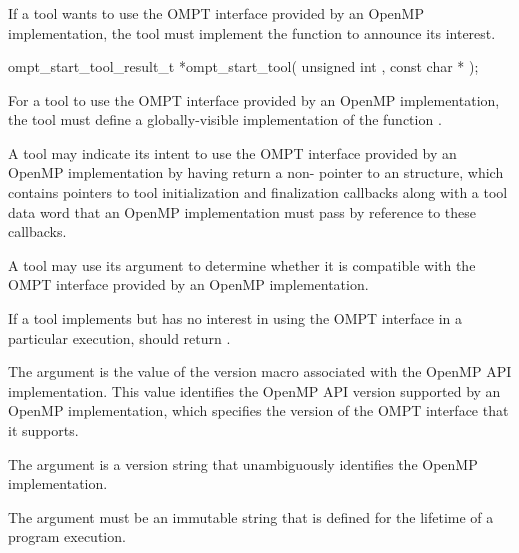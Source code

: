 \subsubsection{}
\label{sec:ompt_start_tool}

\summary
If a tool wants to use the OMPT interface provided by an OpenMP implementation,
the tool must implement the function  to announce its interest.

\format

\begin{cspecific}
\begin{omptOther}
ompt_start_tool_result_t *ompt_start_tool(
  unsigned int ,
  const char *
);
\end{omptOther}
\end{cspecific}


\descr
For a tool to use the OMPT interface provided by an OpenMP implementation,
the tool must define a globally-visible implementation of the
function .

A tool may indicate its intent to use the OMPT interface provided
by an OpenMP implementation by having
 return a non- pointer to an
 structure, which contains pointers to
tool initialization and finalization callbacks along with
a tool data word that an OpenMP implementation must pass by reference
to these callbacks.

A tool may use its argument  to determine
whether it is compatible with the OMPT interface provided by an OpenMP
implementation.

If a tool implements  but has no interest in using
the OMPT interface in a particular execution,
 should return .

\argdesc

The argument 
is the value of the  version macro
associated with the OpenMP API implementation. This value
identifies the OpenMP API version supported by an OpenMP implementation,
which specifies the version of the OMPT interface that it supports.

The argument 
is a version string that unambiguously identifies the OpenMP implementation.

\constraints

The argument  must be
an immutable string that is defined for the lifetime of a program
execution.


